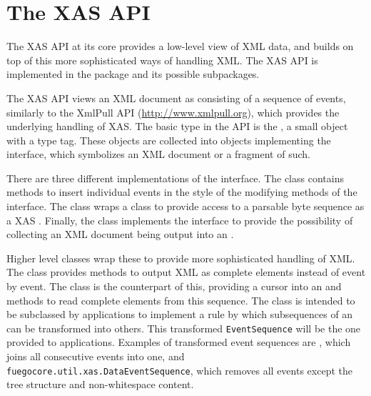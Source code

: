 \documentclass[draft]{article}
\begin{document}
\section{The XAS API}
\label{sec:xas-api}

The XAS API at its core provides a low-level view of XML data, and
builds on top of this more sophisticated ways of handling XML.  The
XAS API is implemented in the package  and
its possible subpackages.

The XAS API views an XML document as consisting of a sequence of
events, similarly to the XmlPull API (\url{http://www.xmlpull.org}),
which provides the underlying handling of XAS.  The basic type in the
API is the , a small object with a type
tag.  These  objects are collected into objects
implementing the  interface,
which symbolizes an XML document or a fragment of such.

There are three different implementations of the 
interface.  The  class contains
methods to insert individual events in the style of the modifying
methods of the  interface.  The
 class wraps a
 class to provide access to a
parsable byte sequence as a XAS .  Finally, the
 class implements the
 interface to provide the
possibility of collecting an XML document being output into an
.

Higher level classes wrap these to provide more sophisticated handling
of XML.  The  class provides
methods to output XML as complete elements instead of event by event.
The  class is the counterpart of
this, providing a cursor into an  and methods to
read complete elements from this sequence.  The
 class is intended to
be subclassed by applications to implement a rule by which
subsequences of an  can be transformed into
others.  This transformed \texttt{Event\-Se\-quence} will be the one
provided to applications.  Examples of transformed event sequences are
, which joins all
consecutive  events into one, and
\texttt{fuegocore.util.xas.Data\-Event\-Se\-quence}, which removes all
events except the tree structure and non\hyp{}whitespace content.
\end{document}
